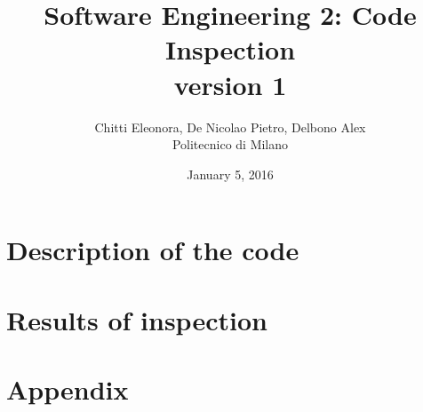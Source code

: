 \documentclass[12pt, a4paper]{report}
\begin{document}
\title{Software Engineering 2: Code Inspection \\ version 1}
\author{Chitti Eleonora, De Nicolao Pietro, Delbono Alex\\
Politecnico di Milano}
\date{January 5, 2016}
\maketitle
\tableofcontents

\chapter{Description of the code}



\chapter{Results of inspection}



\appendix
\chapter{Appendix}




\end{document}
